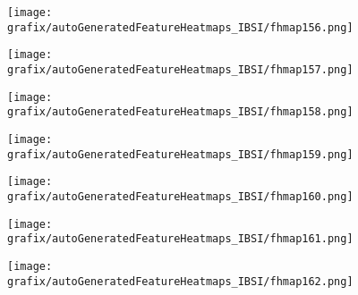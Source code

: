 \hspace{\hsp} 
\begin{subfigure}{\wid\textwidth} 
    \centering 
    \caption{\tiny \sffamily {}} 
    \vspace{\vsp} 
    \texttt{[image: grafix/autoGeneratedFeatureHeatmaps\_IBSI/fhmap156.png]} 
\end{subfigure} 
\hspace{\hsp} 
\begin{subfigure}{\wid\textwidth} 
    \centering 
    \caption{\tiny \sffamily {}} 
    \vspace{\vsp} 
    \texttt{[image: grafix/autoGeneratedFeatureHeatmaps\_IBSI/fhmap157.png]} 
\end{subfigure} 
\hspace{\hsp} 
\begin{subfigure}{\wid\textwidth} 
    \centering 
    \caption{\tiny \sffamily {}} 
    \vspace{\vsp} 
    \texttt{[image: grafix/autoGeneratedFeatureHeatmaps\_IBSI/fhmap158.png]} 
\end{subfigure} 
\hspace{\hsp} 
\begin{subfigure}{\wid\textwidth} 
    \centering 
    \caption{\tiny \sffamily {}} 
    \vspace{\vsp} 
    \texttt{[image: grafix/autoGeneratedFeatureHeatmaps\_IBSI/fhmap159.png]} 
\end{subfigure} 
\hspace{\hsp} 
\begin{subfigure}{\wid\textwidth} 
    \centering 
    \caption{\tiny \sffamily {}} 
    \vspace{\vsp} 
    \texttt{[image: grafix/autoGeneratedFeatureHeatmaps\_IBSI/fhmap160.png]} 
\end{subfigure} 
\hspace{\hsp} 
\begin{subfigure}{\wid\textwidth} 
    \centering 
    \caption{\tiny \sffamily {}} 
    \vspace{\vsp} 
    \texttt{[image: grafix/autoGeneratedFeatureHeatmaps\_IBSI/fhmap161.png]} 
\end{subfigure} 
\hspace{\hsp} 
\begin{subfigure}{\wid\textwidth} 
    \centering 
    \caption{\tiny \sffamily {}} 
    \vspace{\vsp} 
    \texttt{[image: grafix/autoGeneratedFeatureHeatmaps\_IBSI/fhmap162.png]} 
\end{subfigure} 

